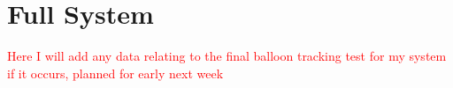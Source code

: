 \section{Full System}

\textcolor{red}{Here I will add any data relating to the final balloon tracking test for my system if it occurs, planned for early next week}